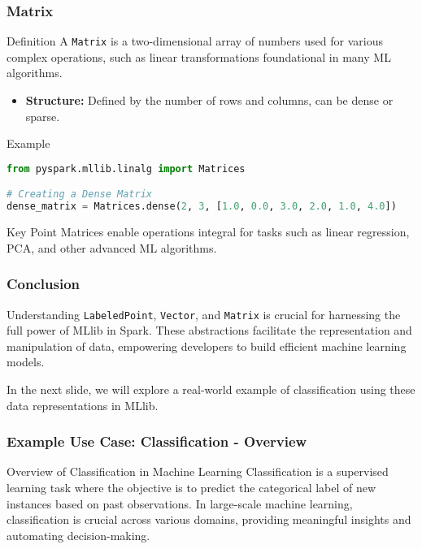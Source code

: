 \documentclass[aspectratio=169]{beamer}
\begin{document}
\begin{frame}[fragile]
    \frametitle{Matrix}
    \begin{block}{Definition}
        A \texttt{Matrix} is a two-dimensional array of numbers used for various complex operations, such as linear transformations foundational in many ML algorithms.
    \end{block}

    \begin{itemize}
        \item \textbf{Structure:} Defined by the number of rows and columns, can be dense or sparse.
    \end{itemize}

    \begin{block}{Example}
    \begin{lstlisting}[language=Python]
from pyspark.mllib.linalg import Matrices

# Creating a Dense Matrix
dense_matrix = Matrices.dense(2, 3, [1.0, 0.0, 3.0, 2.0, 1.0, 4.0])
    \end{lstlisting}
    \end{block}

    \begin{block}{Key Point}
        Matrices enable operations integral for tasks such as linear regression, PCA, and other advanced ML algorithms.
    \end{block}
\end{frame}

\begin{frame}[fragile]
    \frametitle{Conclusion}
    Understanding \texttt{LabeledPoint}, \texttt{Vector}, and \texttt{Matrix} is crucial for harnessing the full power of MLlib in Spark. These abstractions facilitate the representation and manipulation of data, empowering developers to build efficient machine learning models.
    
    In the next slide, we will explore a real-world example of classification using these data representations in MLlib.
\end{frame}

\begin{frame}[fragile]
    \frametitle{Example Use Case: Classification - Overview}
    \begin{block}{Overview of Classification in Machine Learning}
        Classification is a supervised learning task where the objective is to predict the categorical label of new instances based on past observations. In large-scale machine learning, classification is crucial across various domains, providing meaningful insights and automating decision-making.
    \end{block}
\end{frame}
\end{document}

